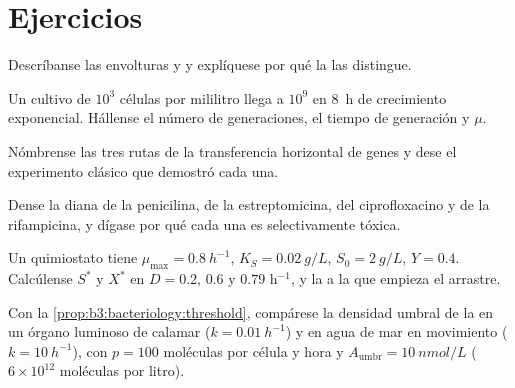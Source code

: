 \section{Ejercicios}

\begin{exercise}[$\star$]\label{exo:b3:bacteriology:1}
Descríbanse las envolturas  y  y explíquese por
qué la  las distingue.
\end{exercise}

\begin{exercise}[$\star$]\label{exo:b3:bacteriology:2}
Un cultivo de $10^{3}$ células por mililitro llega a $10^{9}$ en
\qty{8}{h} de crecimiento exponencial. Hállense el número de
generaciones, el tiempo de generación y $\mu$.
\end{exercise}

\begin{exercise}[$\star$]\label{exo:b3:bacteriology:3}
Nómbrense las tres rutas de la transferencia horizontal de genes y dese
el experimento clásico que demostró cada una.
\end{exercise}

\begin{exercise}[$\star$]\label{exo:b3:bacteriology:4}
Dense la diana de la penicilina, de la estreptomicina, del
ciprofloxacino y de la rifampicina, y dígase por qué cada una es
selectivamente tóxica.
\end{exercise}

\begin{exercise}[$\star\star$]\label{exo:b3:bacteriology:5}
Un quimiostato tiene $\mu_{\max} = \qty{0.8}{h^{-1}}$, $K_{S} =
\qty{0.02}{g/L}$, $S_{0} = \qty{2}{g/L}$, $Y = 0.4$. Calcúlense $S^{*}$ y
$X^{*}$ en $D = 0.2$, $0.6$ y $0.79$ h$^{-1}$, y la  a la
que empieza el arrastre.
\end{exercise}

\begin{exercise}[$\star\star$]\label{exo:b3:bacteriology:6}
Con la \cref{prop:b3:bacteriology:threshold}, compárese la densidad
umbral de la  en un órgano luminoso de calamar ($k =
\qty{0.01}{h^{-1}}$) y en agua de mar en movimiento ($k = \qty{10}{h^{-1}}$),
con $p = 100$ moléculas por célula y hora y $A_{\text{umbr}} =
\qty{10}{nmol/L}$ ($6\times 10^{12}$ moléculas por litro).
\end{exercise}

